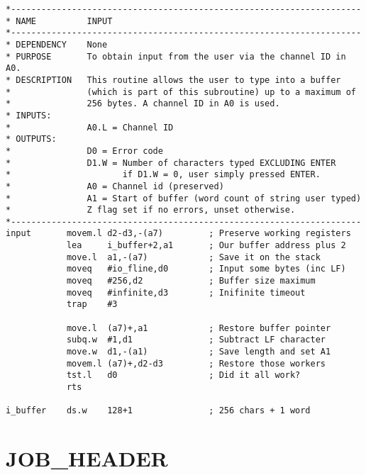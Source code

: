 \begin{lstlisting}[firstnumber=1,caption={INPUT}]
*---------------------------------------------------------------------
* NAME          INPUT
*---------------------------------------------------------------------
* DEPENDENCY    None
* PURPOSE       To obtain input from the user via the channel ID in A0.
* DESCRIPTION   This routine allows the user to type into a buffer
*               (which is part of this subroutine) up to a maximum of
*               256 bytes. A channel ID in A0 is used.
* INPUTS:
*               A0.L = Channel ID
* OUTPUTS:
*               D0 = Error code
*               D1.W = Number of characters typed EXCLUDING ENTER 
*                      if D1.W = 0, user simply pressed ENTER.
*               A0 = Channel id (preserved)
*               A1 = Start of buffer (word count of string user typed)
*               Z flag set if no errors, unset otherwise.
*---------------------------------------------------------------------
input       movem.l d2-d3,-(a7)         ; Preserve working registers
            lea     i_buffer+2,a1       ; Our buffer address plus 2
            move.l  a1,-(a7)            ; Save it on the stack
            moveq   #io_fline,d0        ; Input some bytes (inc LF)
            moveq   #256,d2             ; Buffer size maximum
            moveq   #infinite,d3        ; Inifinite timeout
            trap    #3

            move.l  (a7)+,a1            ; Restore buffer pointer
            subq.w  #1,d1               ; Subtract LF character
            move.w  d1,-(a1)            ; Save length and set A1
            movem.l (a7)+,d2-d3         ; Restore those workers
            tst.l   d0                  ; Did it all work?
            rts

i_buffer    ds.w    128+1               ; 256 chars + 1 word
\end{lstlisting}

\section{JOB\_HEADER}
\label{ch9-JOB_HEADER}%

